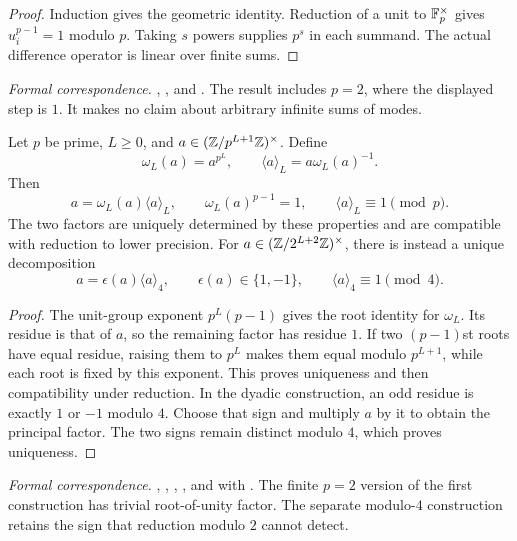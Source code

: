 \begin{proof}
Induction gives the geometric identity. Reduction of a unit to $\mathbb F_p^\times$
gives $u_i^{p-1}=1$ modulo $p$. Taking $s$ powers supplies $p^s$ in each
summand. The actual difference operator is linear over finite sums.
\end{proof}

\begingroup\small\raggedright
\noindent\emph{Formal correspondence.}
,
, and
.
The result includes $p=2$, where the displayed step is $1$. It makes no
claim about arbitrary infinite sums of modes.
\par\endgroup

\begin{theorem}
\label{thm:finite-unit-foundation}
Let $p$ be prime, $L\geq0$, and
$a\in(\mathbb Z/p^{L+1}\mathbb Z)^\times$. Define
\[
\omega_L(a)=a^{p^L},\qquad \langle a\rangle_L=a\omega_L(a)^{-1}.
\]
Then
\[
a=\omega_L(a)\langle a\rangle_L,\qquad
\omega_L(a)^{p-1}=1,\qquad \langle a\rangle_L\equiv1\pmod p.
\]
The two factors are uniquely determined by these properties and are compatible
with reduction to lower precision.
For $a\in(\mathbb Z/2^{L+2}\mathbb Z)^\times$, there is instead a unique decomposition
\[
a=\epsilon(a)\langle a\rangle_4,
\qquad \epsilon(a)\in\{1,-1\},\qquad
\langle a\rangle_4\equiv1\pmod4.
\]
\end{theorem}

\begin{proof}
The unit-group exponent $p^L(p-1)$ gives the root identity for $\omega_L$.
Its residue is that of $a$, so the remaining factor has residue $1$.
If two $(p-1)$st roots have equal residue, raising them to $p^L$ makes them
equal modulo $p^{L+1}$, while each root is fixed by this exponent. This proves
uniqueness and then compatibility under reduction. In the dyadic construction,
an odd residue is exactly $1$ or $-1$ modulo $4$. Choose that sign and multiply
$a$ by it to obtain the principal factor. The two signs remain distinct
modulo $4$, which proves uniqueness.
\end{proof}

\begingroup\small\raggedright
\noindent\emph{Formal correspondence.}
,
,
,
, and
 with
.
The finite $p=2$ version of the first construction has trivial root-of-unity
factor. The separate modulo-$4$ construction retains the sign that reduction
modulo $2$ cannot detect.
\par\endgroup

